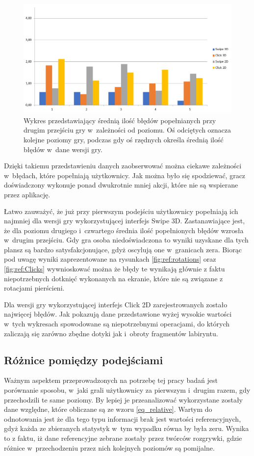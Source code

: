 \documentclass[a4paper,12pt,numbers=noenddot]{report}
\begin{document}
\begin{figure}[h!]
	\centering
  	\includegraphics[width=\linewidth]{diag/errors_2.png}
	\caption{Wykres przedstawiający średnią ilość błędów popełnianych przy drugim przejściu gry w~zależności od poziomu. Oś odciętych oznacza kolejne poziomy gry, podczas gdy oś rzędnych określa średnią ilość błędów w~dane wersji gry.}
	\label{fig:diag_errors_2}
\end{figure}

Dzięki takiemu przedstawieniu danych zaobserwować można ciekawe zależności w~błędach, które popełniają użytkownicy. Jak można było się spodziewać, gracz doświadczony wykonuje ponad dwukrotnie mniej akcji, które nie są wspierane przez aplikację. 

Łatwo zauważyć, że już przy pierwszym podejściu użytkownicy popełniają ich najmniej dla wersji gry wykorzystującej interfejs Swipe 3D. Zastanawiające jest, że dla poziomu drugiego i~czwartego średnia ilość popełnionych błędów wzrosła w~drugim przejściu. Gdy gra osoba niedoświadczona to wyniki uzyskane dla tych plansz są bardzo satysfakcjonujące, gdyż oscylują one w~granicach zera. Biorąc pod uwagę wyniki zaprezentowane na rysunkach \ref{fig:ref:rotations} oraz \ref{fig:ref:Clicks} wywnioskować można że błędy te wynikają głównie z faktu niepotrzebnych dotknięć wykonanych na ekranie, które nie są związane z rotacjami pierścieni.

Dla wersji gry wykorzystującej interfejs Click 2D zarejestrowanych zostało najwięcej błędów. Jak pokazują dane przedstawione wyżej wysokie wartości w~tych wykresach spowodowane są niepotrzebnymi operacjami, do których zaliczają się zarówno zbędne dotyki jak i~obroty fragmentów labiryntu.

\subsection{Różnice pomiędzy podejściami}
Ważnym aspektem przeprowadzonych na potrzebę tej pracy badań jest porównanie sposobu, w~jaki grali użytkownicy za pierwszym i~drugim razem, gdy przechodzili te same poziomy. By lepiej je przeanalizować wykorzystane zostały dane względne, które obliczane są ze wzoru \ref{eq_relative}. Wartym do odnotowania jest że dla tego typu informacji brak jest wartości referencyjnych, gdyż każda ze zbieranych statystyk w~tym wypadku równa by była zeru. Wynika to z faktu, iż dane referencyjne zebrane zostały przez twórców rozgrywki, gdzie różnice w~przechodzeniu przez nich kolejnych poziomów są pomijalne.
\end{document}
